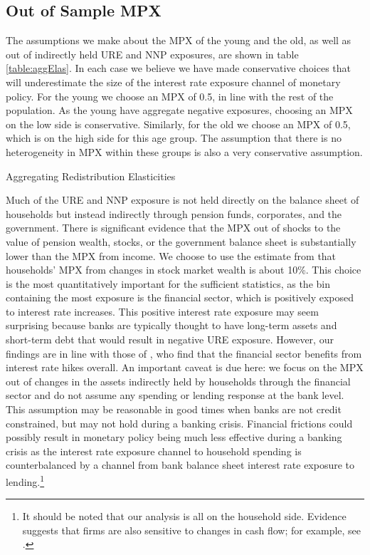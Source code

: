 \documentclass[titlepage]{\econtex}\newcommand{\texname}{ConsumptionHeterogeneity}
\begin{document}
	
	\subsection{Out of Sample MPX}
	The assumptions we make about the MPX of the young and the old, as well as out of indirectly held URE and NNP exposures, are shown in table \ref{table:aggElas}. In each case we believe we have made conservative choices that will underestimate the size of the interest rate exposure channel of monetary policy. For the young we choose an MPX of 0.5, in line with the rest of the population. As the young have aggregate negative exposures, choosing an MPX on the low side is conservative. Similarly, for the old we choose an MPX of 0.5, which is on the high side for this age group. The assumption that there is no heterogeneity in MPX within these groups is also a very conservative assumption.
	\begin{center}
		\begin{table}
			\caption{Aggregating Redistribution Elasticities}
			\label{table:aggElas}
			
		\end{table}
	\end{center}
	Much of the URE and NNP exposure is not held directly on the balance sheet of households but instead indirectly through pension funds, corporates, and the government. There is significant evidence that the MPX out of shocks to the value of pension wealth, stocks, or the government balance sheet is substantially lower than the MPX from income. We choose to use the estimate from \cite{maggio_stock_2018} that households' MPX from changes in stock market wealth is about 10\%. This choice is the most quantitatively important for the sufficient statistics, as the bin containing the most exposure is the financial sector, which is positively exposed to interest rate increases. This positive interest rate exposure may seem surprising because banks are typically thought to have long-term assets and short-term debt that would result in negative URE exposure. However, our findings are in line with those of \cite{landier_banks_2013}, who find that the financial sector benefits from interest rate hikes overall. An important caveat is due here: we focus on the MPX out of changes in the assets indirectly held by households through the financial sector and do not assume any spending or lending response at the bank level. This assumption may be reasonable in good times when banks are not credit constrained, but may not hold during a banking crisis. Financial frictions could possibly result in monetary policy being much less effective during a banking crisis as the interest rate exposure channel to household spending is counterbalanced by a channel from bank balance sheet interest rate exposure to lending.\footnote{It should be noted that our analysis is all on the household side. Evidence suggests that firms are also sensitive to changes in cash flow; for example, see \cite{blanchard_what_1994}.} 
	
\end{document}
